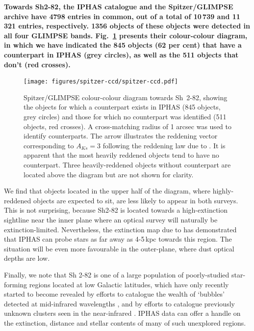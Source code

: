 \documentclass[a4paper,useAMS,usenatbib]{mn2e}
\begin{document}
{\bf Towards Sh2-82,
the IPHAS catalogue and the Spitzer/GLIMPSE archive
have 4798 entries in common,
out of a total of 10\,739 and 11\,321 entries, respectively.
1356 objects of these objects were detected in all
four GLIMPSE bands.
Fig.~\ref{fig:spitzer-ccd} presents their colour-colour diagram,
in which we have indicated the 845 objects (62 per cent)
that have a counterpart in IPHAS (grey circles),
as well as the 511 objects that don't (red crosses).

\begin{figure}
    \texttt{[image: figures/spitzer-ccd/spitzer-ccd.pdf]} 
    \caption{Spitzer/GLIMPSE colour-colour diagram towards Sh~2-82,
    showing the objects for which a counterpart exists in IPHAS
    (845 objects, grey circles) 
    and those for which no counterpart was identified 
    (511 objects, red crosses).
    A cross-matching radius of 1 arcsec
    was used to identify counterparts.
    The arrow illustrates the reddening vector corresponding
    to $A_{Ks}=3$ following the reddening law due to \citet{Flaherty2007}.
    It is apparent that the most heavily reddened objects
    tend to have no counterpart.
    Three heavily-reddened objects without counterpart
    are located above the diagram but are not shown for clarity. }
    \label{fig:spitzer-ccd}
\end{figure}

We find that objects located in the upper half of the diagram,
where highly-reddened objects are expected to sit,
are less likely to appear in both surveys.
This is not surprising,
because Sh2-82 is located 
towards a high-extinction sightline 
near the inner plane
where an optical survey will naturally be extinction-limited.
Nevertheless, the extinction map due to \citet{Sale2014}
has demonstrated that IPHAS can probe stars as far away 
as 4-5\,kpc towards this region.
The situation will be even more favourable
in the outer-plane, where dust optical depths are low.

Finally, we note that Sh 2-82 is one of a large population 
of poorly-studied star-forming regions
located at low Galactic latitudes,
which have only recently started to become revealed
by efforts to catalogue the wealth of `bubbles' detected
at mid-infrared wavelengths \citep{Churchwell2006,Simpson2012},
and by efforts to catalogue previously unknown clusters seen 
in the near-infrared \cite[e.g.][]{Bica2003}.
IPHAS data can offer a handle
on the extinction, distance
and stellar contents of many of such unexplored regions.
}
\end{document}
